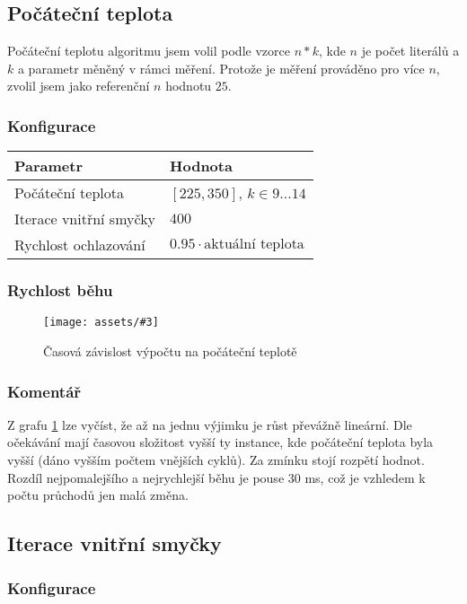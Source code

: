 \documentclass[czech]{article}
\newcommand{\image}[3]{
    \begin{figure}[H]
        \centering
        \texttt{[image: assets/\#3]}
        \caption{#2}
        \label{fig:#1}
    \end{figure}
}
\begin{document}
\subsection{Počáteční teplota}

Počáteční teplotu algoritmu jsem volil podle vzorce $n*k$, kde $n$ je počet literálů a $k$ a parametr měněný v rámci měření.
Protože je měření prováděno pro více $n$, zvolil jsem jako referenční $n$ hodnotu $25$.

\subsubsection*{Konfigurace}

\begin{tabular}{ | l | l | }
    \hline
    Parametr & Hodnota \\ \hline \hline
    Počáteční teplota & $[225, 350]$, $k \in 9\dots14$ \\
    Iterace vnitřní smyčky & $400$ \\
    Rychlost ochlazování & $0.95 \cdot \textrm{aktuální teplota}$ \\ \hline
\end{tabular}

\subsubsection*{Rychlost běhu}

\image{initial-temperature}{Časová závislost výpočtu na počáteční teplotě}{initial-temperature.png}

\subsubsection*{Komentář}

Z grafu \ref{fig:initial-temperature} lze vyčíst, že až na jednu výjimku je růst převážně lineární.
Dle očekávání mají časovou složitost vyšší ty instance, kde počáteční teplota byla vyšší (dáno vyšším počtem vnějších cyklů).
Za zmínku stojí rozpětí hodnot.
Rozdíl nejpomalejšího a nejrychlejší běhu je pouse $30$ ms, což je vzhledem k počtu průchodů jen malá změna.

\subsection{Iterace vnitřní smyčky}

\subsubsection*{Konfigurace}
\end{document}
